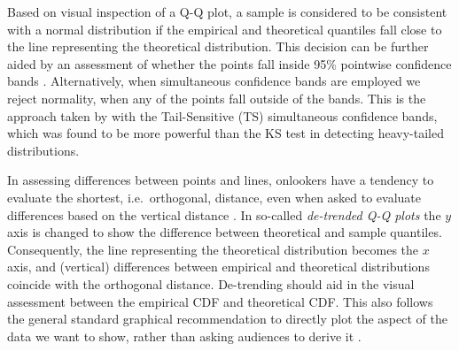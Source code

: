 \documentclass[12pt]{article}\usepackage[]{graphicx}\usepackage[]{color}
\newcommand{\hh}[1]{{\color{magenta} #1}}
\newcommand{\alnote}[1]{\todo[inline,color=green!40]{#1}}
\newcommand{\hhnote}[1]{\todo[inline,color=magenta!40]{#1}}
\begin{document}


Based on visual inspection of a Q-Q plot, a
 sample is considered to be consistent with a normal distribution if the empirical and theoretical quantiles fall close to the line representing the theoretical distribution.  This decision can be further aided by an assessment of
 whether the points fall inside 95\%  pointwise confidence bands \citep[][p.~150--154]{Davison:1997}. \hh{Alternatively, when simultaneous confidence bands are employed we reject normality, when any of the points fall outside of the bands.} This is the approach taken by \citet{buja:2013} with the Tail-Sensitive (TS) simultaneous confidence bands, which was found to be more powerful than the KS test in detecting heavy-tailed distributions.


In assessing differences between points and lines, onlookers have a tendency to evaluate the shortest, i.e.~orthogonal, distance, even when asked to evaluate differences based on the vertical distance \citep{sineillusion, robbins:2005, cleveland:1984}. 
In so-called {\it de-trended Q-Q plots} \citep[][p.~25--26]{thode:2002} the $y$ axis is changed to show the difference between theoretical and sample quantiles. 
Consequently, the line representing the theoretical distribution becomes the $x$ axis,
and (vertical) differences between empirical and theoretical distributions coincide with the orthogonal distance. 
De-trending should aid in the visual assessment between the empirical CDF and theoretical CDF. This also follows the general standard graphical recommendation to directly plot the aspect of the data we want to show, rather than asking audiences to derive it \citep{wainer:2000}.
\end{document}
